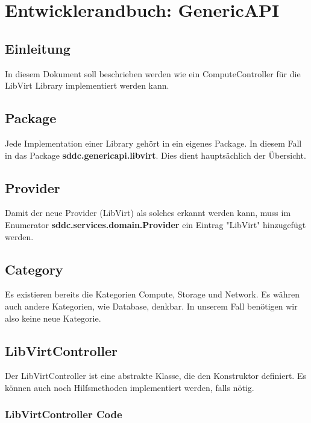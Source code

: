 \chapter{Entwicklerandbuch: GenericAPI}
\section{Einleitung}
In diesem Dokument soll beschrieben werden wie ein ComputeController für die LibVirt Library implementiert werden kann. 

\section{Package}
Jede Implementation einer Library gehört in ein eigenes Package. In diesem Fall in das Package 
\textbf{sddc.genericapi.libvirt}. Dies dient hauptsächlich der Übersicht.

\section{Provider}
Damit der neue Provider (LibVirt) als solches erkannt werden kann, muss im Enumerator 
\textbf{sddc.services.domain.Provider} ein Eintrag "LibVirt" hinzugefügt werden.

\section{Category}
Es existieren bereits die Kategorien Compute, Storage und Network. Es währen auch andere Kategorien, wie Database, denkbar. In unserem Fall benötigen wir also keine neue Kategorie.

\newpage

\section{LibVirtController}
Der LibVirtController ist eine abstrakte Klasse, die den Konstruktor definiert. Es können auch noch Hilfsmethoden implementiert werden, falls nötig.

\subsection{LibVirtController Code}

